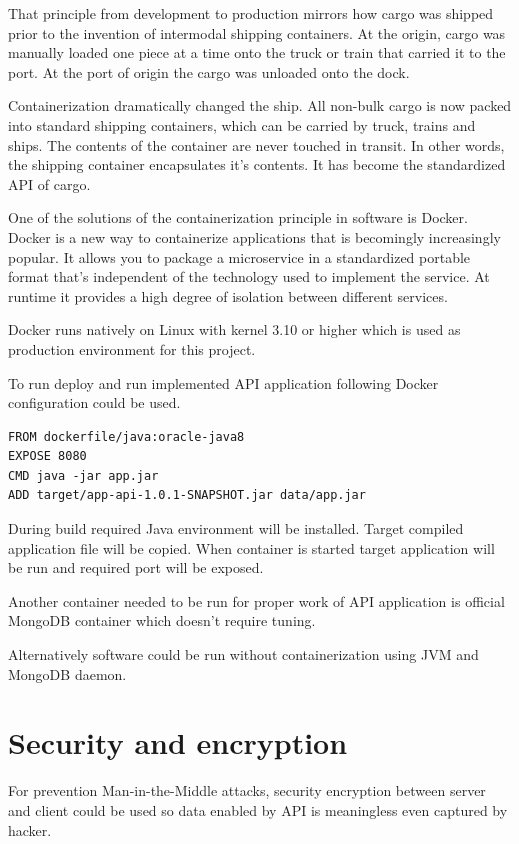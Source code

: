 \documentclass[thesis=M,english]{FITthesis}[2012/10/20]
\begin{document}
That principle from development to production mirrors how cargo was shipped prior to the invention of intermodal shipping containers. At the origin, cargo was manually loaded one piece at a time onto the truck or train that carried it to the port. At the port of origin the cargo was unloaded onto the dock.

Containerization dramatically changed the ship. All non-bulk cargo is now packed into standard shipping containers, which can be carried by truck, trains and ships. The contents of the container are never touched in transit. In other words, the shipping container encapsulates it’s contents. It has become the standardized API of cargo.

One of the solutions of the containerization principle in software is Docker. Docker is a new way to containerize applications that is becomingly increasingly popular. It allows you to package a microservice in a standardized portable format that’s independent of the technology used to implement the service. At runtime it provides a high degree of isolation between different services.

Docker runs natively on Linux with kernel 3.10 or higher which is used as production environment for this project.

To run deploy and run implemented API application following Docker configuration could be used.

\begin{lstlisting}
FROM dockerfile/java:oracle-java8
EXPOSE 8080
CMD java -jar app.jar
ADD target/app-api-1.0.1-SNAPSHOT.jar data/app.jar
\end{lstlisting}

During build required Java environment will be installed. Target compiled application file will be copied. When container is started target application will be run and required port will be exposed.

Another container needed to be run for proper work of API application is official MongoDB container which doesn't require tuning.

Alternatively software could be run without containerization using JVM and MongoDB daemon.


\section{Security and encryption}

For prevention Man-in-the-Middle attacks, security encryption between server and client could be used so data enabled by API is meaningless even captured by hacker.
\end{document}
